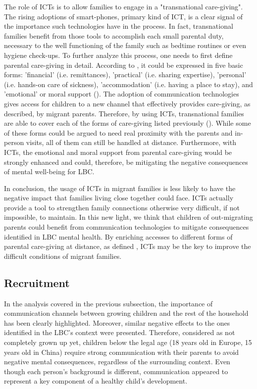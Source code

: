 The role of ICTs is to allow families to engage in a "transnational care-giving". The rising adoptions of smart-phones, primary kind of ICT, is a clear signal of the importance such technologies have in the process. In fact, transnational families benefit from those tools to accomplish each small parental duty, necessary to the well functioning of the family such as bedtime routines or even hygiene check-ups. To further analyze this process, one needs to first define parental care-giving in detail. According to \textcite{finch1989family}, it could be expressed in five basic forms: 'financial' (i.e. remittances), 'practical' (i.e. sharing expertise), 'personal' (i.e. hands-on care of sickness), 'accommodation' (i.e. having a place to stay), and 'emotional' or moral support (\cite{bacigalupe2011virtualizing}). The adoption of communication technologies gives access for children to a new channel that effectively provides care-giving, as described, by migrant parents. Therefore, by using ICTs, transnational families are able to cover each of the forms of care-giving listed previously (\cite{baldassar2007transnational}). While some of these forms could be argued to need real proximity with the parents and in-person visits, all of them can still be handled at distance. Furthermore, with ICTs, the emotional and moral support from parental care-giving would be strongly enhanced and could, therefore, be mitigating the negative consequences of mental well-being for LBC.

In conclusion, the usage of ICTs in migrant families is less likely to have the negative impact that families living close together could face. ICTs actually provide a tool to strengthen family connections otherwise very difficult, if not impossible, to maintain. In this new light, we think that children of out-migrating parents could benefit from communication technologies to mitigate consequences identified in LBC mental health. By enriching accesses to different forms of parental care-giving at distance, as defined \textcite{finch1989family}, ICTs may be the key to improve the difficult conditions of migrant families.

\subsection{Recruitment}
\label{methods-recruitment}
In the analysis covered in the previous subsection, the importance of communication channels between growing children and the rest of the household has been clearly highlighted. Moreover, similar negative effects to the ones identified in the LBC's context were presented. Therefore, considered as not completely grown up yet, children below the legal age (18 years old in Europe, 15 years old in China) require strong communication with their parents to avoid negative mental consequences, regardless of the surrounding context. Even though each person's background is different, communication appeared to represent a key component of a healthy child's development.

